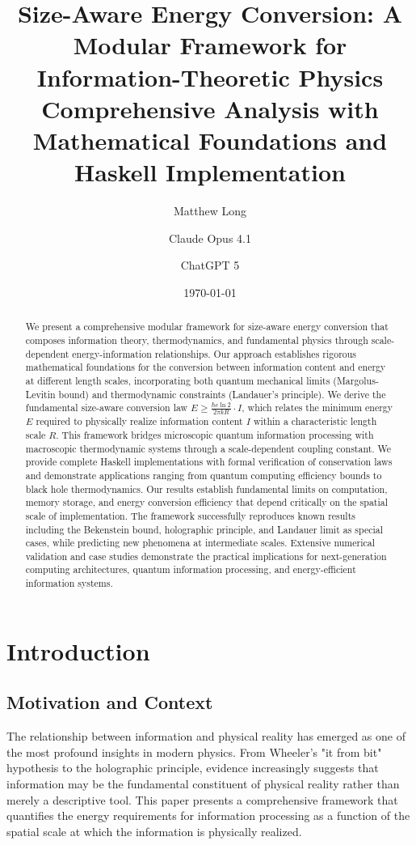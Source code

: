 \documentclass[11pt,a4paper]{article}
\title{Size-Aware Energy Conversion: A Modular Framework for Information-Theoretic Physics\\[0.5em]
\large Comprehensive Analysis with Mathematical Foundations and Haskell Implementation}
\author[1]{Matthew Long}
\author[2]{Claude Opus 4.1}
\author[3]{ChatGPT 5}
\affil[1]{YonedaAI}
\affil[2]{Anthropic}
\affil[3]{OpenAI}
\date{\today}
\theoremstyle{definition}
\begin{document}
\maketitle

\begin{abstract}
We present a comprehensive modular framework for size-aware energy conversion that composes information theory, thermodynamics, and fundamental physics through scale-dependent energy-information relationships. Our approach establishes rigorous mathematical foundations for the conversion between information content and energy at different length scales, incorporating both quantum mechanical limits (Margolus-Levitin bound) and thermodynamic constraints (Landauer's principle). We derive the fundamental size-aware conversion law $E \geq \frac{\hbar c \ln 2}{2\pi k R} \cdot I$, which relates the minimum energy $E$ required to physically realize information content $I$ within a characteristic length scale $R$. This framework bridges microscopic quantum information processing with macroscopic thermodynamic systems through a scale-dependent coupling constant. We provide complete Haskell implementations with formal verification of conservation laws and demonstrate applications ranging from quantum computing efficiency bounds to black hole thermodynamics. Our results establish fundamental limits on computation, memory storage, and energy conversion efficiency that depend critically on the spatial scale of implementation. The framework successfully reproduces known results including the Bekenstein bound, holographic principle, and Landauer limit as special cases, while predicting new phenomena at intermediate scales. Extensive numerical validation and case studies demonstrate the practical implications for next-generation computing architectures, quantum information processing, and energy-efficient information systems.
\end{abstract}

\tableofcontents
\newpage

\section{Introduction}

\subsection{Motivation and Context}

The relationship between information and physical reality has emerged as one of the most profound insights in modern physics. From Wheeler's "it from bit" hypothesis to the holographic principle, evidence increasingly suggests that information may be the fundamental constituent of physical reality rather than merely a descriptive tool. This paper presents a comprehensive framework that quantifies the energy requirements for information processing as a function of the spatial scale at which the information is physically realized.
\end{document}
